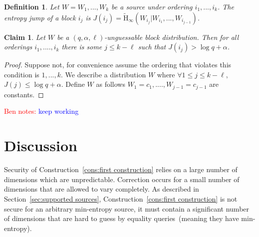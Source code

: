 \documentclass[11pt]{article}
\newcommand{\secref}[1]{\mbox{Section~\ref{#1}}}
\newcommand{\consref}[1]{\mbox{Construction~\ref{#1}}}
\newcommand{\Hav}{\tilde{\mathrm{H}}_\infty}
\newtheorem{definition}[theorem]{Definition}
\newtheorem{claim}[theorem]{Claim}
\newcommand{\authnote}[2]{{\textcolor{red}{\textsf{#1 notes: }\textcolor{blue}{ #2}}\marginpar{\textcolor{red}{\textbf{!!!!!}}}}}
\newcommand{\authnote}[2]{}
\newcommand{\bnote}[1]{{\authnote{Ben}{#1}}}
\begin{document}
\begin{definition}
Let $W = W_1,..., W_k$ be a source under ordering $i_1,..., i_k$.  The \emph{entropy jump} of a block $i_j$ is $J(i_j) = \Hav(W_{i_j} | W_{i_1},..., W_{i_{j-1}})$.
\end{definition}

\begin{claim}
Let $W$ be a $(q, \alpha, \ell)$-unguessable block distribution.  Then for all orderings $i_1, ...., i_k$ there is some $j\leq k-\ell$ such that $J(i_j)> \log q + \alpha$.
\end{claim}
\begin{proof}
Suppose not, for convenience assume the ordering that violates this condition is $1,..., k$.  We describe a distribution $W$ where $\forall 1\leq j\leq k-\ell$, $J(j)\leq \log q +\alpha$. Define $W$ as follows $W_1 = c_1,...., W_{j-1} = c_{j-1}$ are constants.
\end{proof}
\bnote{keep working}

\section{Discussion}
\label{sec:discussion}
Security of \consref{cons:first construction} relies on a large number of dimensions which are unpredictable.  Correction occurs for a small number of dimensions that are allowed to vary completely.  As described in \secref{sec:supported sources}, \consref{cons:first construction} is not secure for an arbitrary min-entropy source, it must contain a significant number of dimensions that are hard to guess by equality queries~(meaning they have min-entropy).
\end{document}
